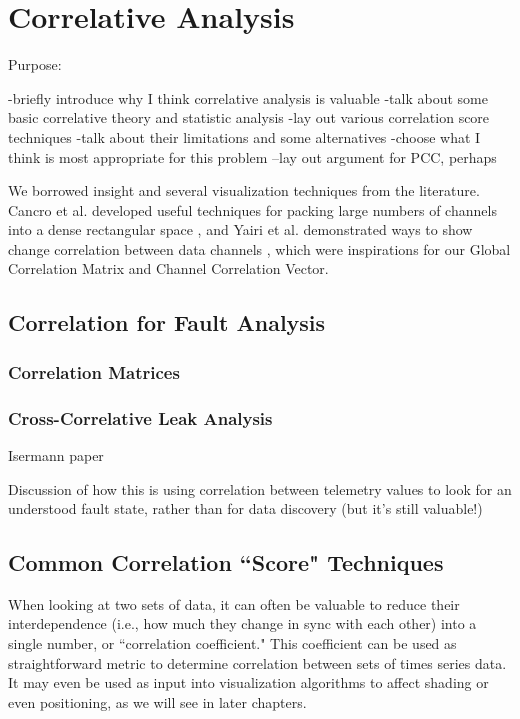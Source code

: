 \chapter{Correlative Analysis}

Purpose:

-briefly introduce why I think correlative analysis is valuable
-talk about some basic correlative theory and statistic analysis
-lay out various correlation score techniques
-talk about their limitations and some alternatives
-choose what I think is most appropriate for this problem
--lay out argument for PCC, perhaps

We borrowed insight and several visualization techniques from the literature. Cancro et al. developed useful techniques for packing large numbers of channels into a dense rectangular space \cite{Cancro}, and Yairi et al. demonstrated ways to show change correlation between data channels \cite{Yairi}, which were inspirations for our Global Correlation Matrix and Channel Correlation Vector. 


\section{Correlation for Fault Analysis}

\subsection{Correlation Matrices}



\subsection{Cross-Correlative Leak Analysis}

Isermann paper

Discussion of how this is using correlation between telemetry values to look for an understood fault state, rather than for data discovery (but it's still valuable!)

\section{Common Correlation ``Score" Techniques}

When looking at two sets of data, it can often be valuable to reduce their interdependence (i.e., how much they change in sync with each other) into a single number, or ``correlation coefficient." This coefficient can be used as straightforward metric to determine correlation between sets of times series data. It may even be used as input into visualization algorithms to affect shading or even positioning, as we will see in later chapters.


